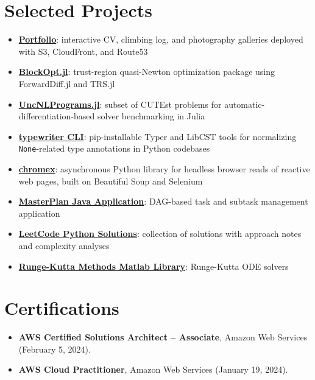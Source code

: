 \documentclass[10pt,letterpaper]{article}
\newcommand{\resumeItem}[1]{\item \small #1}
\newcommand{\resumeLink}[2]{\href{#1}{#2}}
\begin{document}
\section*{Selected Projects}
\begin{itemize}
  \resumeItem{\textbf{\resumeLink{https://github.com/danphenderson/dev-danhenderson}{Portfolio}}: interactive CV, climbing log, and photography galleries deployed with S3, CloudFront, and Route53}
  \resumeItem{\textbf{\resumeLink{https://github.com/danphenderson/BlockOpt.jl}{BlockOpt.jl}}: trust-region quasi-Newton optimization package using ForwardDiff.jl and TRS.jl}
  \resumeItem{\textbf{\resumeLink{https://github.com/danphenderson/UncNLPrograms.jl}{UncNLPrograms.jl}}: subset of CUTEst problems for automatic-differentiation-based solver benchmarking in Julia}
    \resumeItem{\textbf{\resumeLink{https://github.com/danphenderson/python-typewriter}{typewriter CLI}}: pip-installable Typer and LibCST tools for normalizing \texttt{None}-related type annotations in Python codebases}
  \resumeItem{\textbf{\resumeLink{https://github.com/danphenderson/python-chromex}{chromex}}: asynchronous Python library for headless browser reads of reactive web pages, built on Beautiful Soup and Selenium}
  \resumeItem{\textbf{\resumeLink{https://github.com/danphenderson/masterplan-app}{MasterPlan Java Application}}: DAG-based task and subtask management application}
  \resumeItem{\textbf{\resumeLink{https://github.com/danphenderson/leetcode-solutions}{LeetCode Python Solutions}}: collection of solutions with approach notes and complexity analyses}
  \resumeItem{\textbf{\resumeLink{https://github.com/danphenderson/runge-kutta-matlab}{Runge-Kutta Methods Matlab Library}}: Runge-Kutta ODE solvers}
\end{itemize}

\section*{Certifications}
\begin{itemize}
  \resumeItem{\textbf{AWS Certified Solutions Architect -- Associate}, Amazon Web Services (February 5, 2024).}
  \resumeItem{\textbf{AWS Cloud Practitioner}, Amazon Web Services (January 19, 2024).}
\end{itemize}
\end{document}
